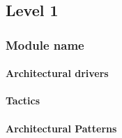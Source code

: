 \subsection{Level 1}
\subsubsection{Module name}
\paragraph{Architectural drivers}
\paragraph{Tactics}
\paragraph{Architectural Patterns}
